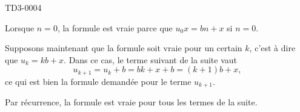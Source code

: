 
\begin{corrige}{TD3-0004}

	Lorsque $n=0$, la formule est vraie parce que $u_0x=bn+x$ si $n=0$.

	Supposons maintenant que la formule soit vraie pour un certain $k$, c'est à dire que $u_k=kb+x$. Dans ce cas, le terme suivant de la suite vaut
	\begin{equation}
		u_{k+1}=u_k+b=bk+x+b=(k+1)b+x,
	\end{equation}
	ce qui est bien la formule demandée pour le terme $u_{k+1}$.

	Par récurrence, la formule est vraie pour tous les termes de la suite.

\end{corrige}
